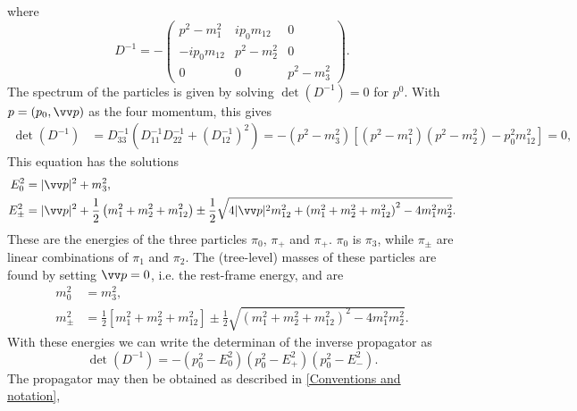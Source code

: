 where
\begin{equation*}
    D^{-1} = -
    \begin{pmatrix}
        p^2 - m^2_1             & i p_0 m_{12}     & 0             \\
        - i p_0 m_{12}            & p^2 - m^2_2       & 0             \\
        0                       & 0                 & p^2 - m^2_3
    \end{pmatrix}.
\end{equation*}
The spectrum of the particles is given by solving $\det(D^{-1}) = 0$ for $p^0$. With $p = (p_0, \vv p)$ as the four momentum, this gives
\begin{align*}
    \det(D^{-1}) & = D^{-1}_{33} \left(D^{-1}_{11} D^{-1}_{22} + (D^{-1}_{12})^2\right)
    = - \left(p^2 - m^2_3\right)
    \left[
        \left(p^2 - m^2_1\right)
        \left(p^2 - m^2_2\right)
        - p_0^2 m_{12}^2
    \right] = 0,
\end{align*}
This equation has the solutions
\begin{align}
    \label{dispresion relation pi 0}
    E_0^2 &= |\vv p|^2 + m_3^2, \\
    \label{dispresion relation pi pm}
    E_\pm^2
    & = |\vv p|^2 +
    \frac{1}{2}
    \left(
        m_1^2 + m_2^2 + m_{12}^2 
    \right)
    \pm 
    \frac{1}{2}
    \sqrt{
        4|\vv p|^2m_{12}^2 
        +
        \left(
            m_1^2 + m_2^2 + m_{12}^2
        \right)^2
        - 4 m_1^2 m_2^2
    }.
\end{align}
These are the energies of the three particles $\pi_0$, $\pi_+$ and $\pi_+$.
$\pi_0$ is $\pi_3$, while $\pi_\pm$ are linear combinations of $\pi_1$ and $\pi_2$.
The (tree-level) masses of these particles are found by setting $\vv p = 0$, i.e. the rest-frame energy, and are
\begin{align}
    m_0^2 &= m_3^2, \\
    m_\pm^2
    & =  \frac{1}{2}
    \left[
        m_1^2 + m_2^2 + m_{12}^2 
    \right]
    \pm \frac{1}{2}
    \sqrt{
        \left(
            m_1^2 + m_2^2 + m_{12}^2
        \right)^2
        - 4 m_1^2 m_2^2
    }.
\end{align}
With these energies we can write the determinan of the inverse propagator as
\begin{equation}
    \det(D^{-1}) = - (p_0^2 - E_0^2) (p_0^2 - E_+^2) (p_0^2 - E_-^2).
\end{equation}
The propagator may then be obtained as described in \autoref{Conventions and notation},
